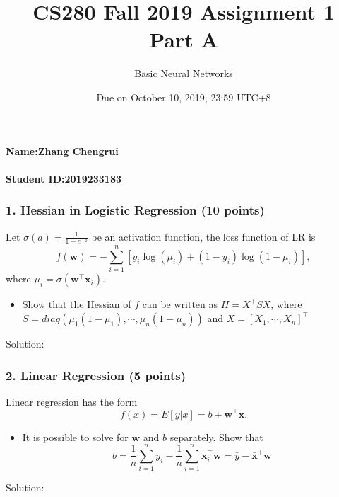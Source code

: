 \documentclass[12pt]{article}%
\begin{document}
\title{CS280 Fall 2019 Assignment 1 \\ Part A}
\author{Basic Neural Networks}
\date{Due on October 10, 2019, 23:59 UTC+8}
\maketitle

\paragraph{Name:Zhang Chengrui}

\paragraph{Student ID:2019233183}

\newpage


\subsubsection*{1. Hessian in Logistic Regression (10 points)}
Let $\sigma(a)=\frac{1}{1+e^{-a}}$ be an activation function, the loss function of LR is  \[f(\mathbf{w})=-\sum_{i=1}^{n}[y_i\log(\mu_i)+(1-y_i)\log(1-\mu_i)],\] where $\mu_i=\sigma(\mathbf{w}^\intercal\mathbf{x}_i)$. 
\begin{itemize}
	\item Show that the Hessian of $f$ can be written as $H=X^\intercal S X$, where $S=diag(\mu_1(1-\mu_1),\cdots, \mu_n(1-\mu_n))$ and $X = [X_1,\cdots, X_n]^\intercal$
\end{itemize}

\par
Solution: \par


\newpage


\subsubsection*{2. Linear Regression (5 points)}
Linear regression has the form \[f(x)=E[y|x] = b + \mathbf{w}^\intercal \mathbf{x}.\]  
\begin{itemize}
	\item It is possible to solve for $\mathbf{w}$ and $b$ separately. Show that 
	\[b = \frac{1}{n}\sum_{i=1}^n y_i -\frac{1}{n}\sum_{i=1}^n \mathbf{x}_i^\intercal \mathbf{w} = \bar{y} - \bar{\mathbf{x}}^\intercal \mathbf{w}\]
\end{itemize}
\par
Solution: \par
\end{document}
